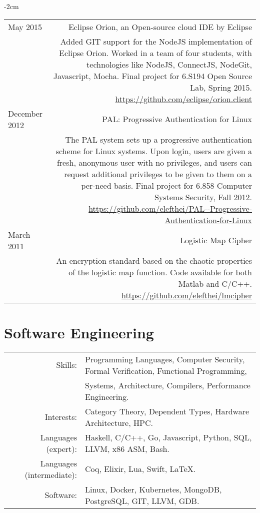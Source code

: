 \documentclass[lettersize,10pt]{article}
\begin{document}
\begin{adjustwidth}{}{-2cm}
\begin{tabularx}{\textwidth}{L R}
    May 2015 & {\sc Eclipse Orion, an Open-source cloud IDE by Eclipse} \\
    & Added GIT support for the NodeJS implementation of Eclipse Orion. Worked in a team of four students, with technologies like NodeJS,
    ConnectJS, NodeGit, Javascript, Mocha. Final project for 6.S194 Open Source Lab, Spring 2015.
    \url{https://github.com/eclipse/orion.client} \\

    December 2012 & {\sc PAL: Progressive Authentication for Linux} \\
    & The PAL system sets up a progressive authentication scheme for Linux systems. Upon login, users are given a fresh, anonymous user
    with no privileges, and users can request additional privileges to be given to them on a per-need basis. Final project for 6.858 Computer
    Systems Security, Fall 2012. \url{https://github.com/elefthei/PAL--Progressive-Authentication-for-Linux} \\

    March 2011 & {\sc Logistic Map Cipher} \\
    & An encryption standard based on the chaotic properties of the logistic map
    function. Code available for both Matlab and C/C++. \url{https://github.com/elefthei/lmcipher} \\

  \end{tabularx}
\end{adjustwidth}

\section{Software Engineering}
\begin{tabular}{rl}
Skills:& Programming Languages, Computer Security, Formal Verification, Functional Programming, \\
	   & Systems, Architecture, Compilers, Performance Engineering. \\
Interests:& Category Theory, Dependent Types, Hardware Architecture, HPC. \\
Languages (expert):& Haskell, C/C++, Go, Javascript, Python, SQL, LLVM, x86 ASM, Bash. \\
Languages (intermediate):& Coq, Elixir, Lua, Swift, \LaTeX. \\
Software:& Linux, Docker, Kubernetes, MongoDB, PostgreSQL, GIT, LLVM, GDB. \\
\end{tabular}
\end{document}
